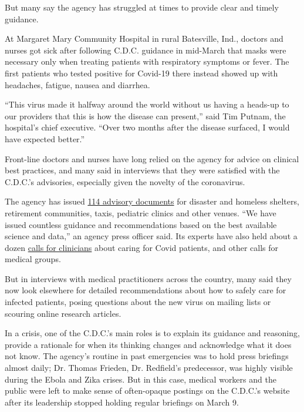 But many say the agency has struggled at times to provide clear and
timely guidance.

At Margaret Mary Community Hospital in rural Batesville, Ind., doctors
and nurses got sick after following C.D.C. guidance in mid-March that
masks were necessary only when treating patients with respiratory
symptoms or fever. The first patients who tested positive for Covid-19
there instead showed up with headaches, fatigue, nausea and diarrhea.

``This virus made it halfway around the world without us having a
heads-up to our providers that this is how the disease can present,''
said Tim Putnam, the hospital's chief executive. ``Over two months after
the disease surfaced, I would have expected better.''

Front-line doctors and nurses have long relied on the agency for advice
on clinical best practices, and many said in interviews that they were
satisfied with the C.D.C.'s advisories, especially given the novelty of
the coronavirus.

The agency has issued
\href{https://www.cdc.gov/coronavirus/2019-ncov/communication/guidance-list.html?Sort=Date\%3A\%3Adesc}{114
advisory documents} for disaster and homeless shelters, retirement
communities, taxis, pediatric clinics and other venues. ``We have issued
countless guidance and recommendations based on the best available
science and data,'' an agency press officer said. Its experts have also
held about a dozen
\href{https://emergency.cdc.gov/coca/calls/2020/index.asp}{calls for
clinicians} about caring for Covid patients, and other calls for medical
groups.

But in interviews with medical practitioners across the country, many
said they now look elsewhere for detailed recommendations about how to
safely care for infected patients, posing questions about the new virus
on mailing lists or scouring online research articles.

In a crisis, one of the C.D.C.'s main roles is to explain its guidance
and reasoning, provide a rationale for when its thinking changes and
acknowledge what it does not know. The agency's routine in past
emergencies was to hold press briefings almost daily; Dr. Thomas
Frieden, Dr. Redfield's predecessor, was highly visible during the Ebola
and Zika crises. But in this case, medical workers and the public were
left to make sense of often-opaque postings on the C.D.C.'s website
after ​its leadership stopped holding regular briefings on March 9.


